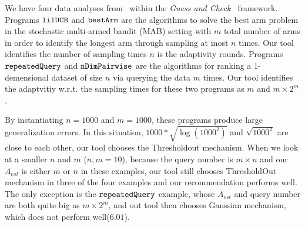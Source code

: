 We have four data analyses  from~\cite{Jamieson2015TheAO} within the \emph{Guess and Check}~\cite{RogersRSSTW20} framework.
Programs $\mathtt{lilUCB}$ and $\mathtt{bestArm}$ are the algorithms to solve the best arm problem in the stochastic multi-armed bandit (MAB) setting
with $m$ total number of arms in order to identify the longest arm through sampling at most $n$ times.
Our tool identifies the number of sampling times $n$ is the adaptivity rounds.
Programs $\mathtt{repeatedQuery}$ and $\mathtt{nDimPairwise}$ are the algorithms for ranking
a $1$-demensional dataset of size $n$ via querying the data $m$ times.
Our tool identifies the adaptvitiy w.r.t. the sampling times for these two programs as $m$ and $m \times 2^m$.


By instantiating $n = 1000$ and $m = 1000$, these programs produce large generalization errors.
In this situation, $1000* \sqrt{\log(1000^2)}$ and $\sqrt{1000^2}$ are close to each other,
our tool chooses the Thresholdout mechanism.
When we look at a smaller $n$ and $m$ ($n,m=10$), because the query number is $m \times n$ and our $A_{est}$ is either $m$ or $n$ in these examples,
our tool still chooses ThresholdOut mechanism in three of the four examples  and our recommendation performs well. The only
exception is the $\mathtt{repeatedQuery}$ example, whose $A_{est}$ and query number are both quite big as $m \times 2^m$, and out tool
then chooses Gaussian mechanism, which does not perform well($6.01$).


